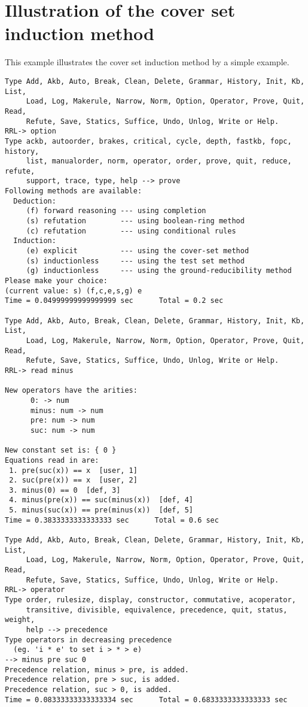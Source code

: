 \chapter{Illustration of the cover set induction method}
\normalsize
\rm
This example illustrates the cover set induction method by a simple 
example.

\small
\begin{verbatim}
Type Add, Akb, Auto, Break, Clean, Delete, Grammar, History, Init, Kb, List,
     Load, Log, Makerule, Narrow, Norm, Option, Operator, Prove, Quit, Read,
     Refute, Save, Statics, Suffice, Undo, Unlog, Write or Help.
RRL-> option
Type ackb, autoorder, brakes, critical, cycle, depth, fastkb, fopc, history, 
     list, manualorder, norm, operator, order, prove, quit, reduce, refute, 
     support, trace, type, help --> prove
Following methods are available:
  Deduction:
     (f) forward reasoning --- using completion
     (s) refutation        --- using boolean-ring method
     (c) refutation        --- using conditional rules
  Induction:
     (e) explicit          --- using the cover-set method
     (s) inductionless     --- using the test set method
     (g) inductionless     --- using the ground-reducibility method
Please make your choice: 
(current value: s) (f,c,e,s,g) e
Time = 0.04999999999999999 sec      Total = 0.2 sec

Type Add, Akb, Auto, Break, Clean, Delete, Grammar, History, Init, Kb, List,
     Load, Log, Makerule, Narrow, Norm, Option, Operator, Prove, Quit, Read,
     Refute, Save, Statics, Suffice, Undo, Unlog, Write or Help.
RRL-> read minus

New operators have the arities:
      0: -> num
      minus: num -> num
      pre: num -> num
      suc: num -> num

New constant set is: { 0 }
Equations read in are:
 1. pre(suc(x)) == x  [user, 1]
 2. suc(pre(x)) == x  [user, 2]
 3. minus(0) == 0  [def, 3]
 4. minus(pre(x)) == suc(minus(x))  [def, 4]
 5. minus(suc(x)) == pre(minus(x))  [def, 5]
Time = 0.3833333333333333 sec      Total = 0.6 sec

Type Add, Akb, Auto, Break, Clean, Delete, Grammar, History, Init, Kb, List,
     Load, Log, Makerule, Narrow, Norm, Option, Operator, Prove, Quit, Read,
     Refute, Save, Statics, Suffice, Undo, Unlog, Write or Help.
RRL-> operator
Type order, rulesize, display, constructor, commutative, acoperator, 
     transitive, divisible, equivalence, precedence, quit, status, weight, 
     help --> precedence
Type operators in decreasing precedence
  (eg. 'i * e' to set i > * > e) 
--> minus pre suc 0 
Precedence relation, minus > pre, is added.
Precedence relation, pre > suc, is added.
Precedence relation, suc > 0, is added.
Time = 0.08333333333333334 sec      Total = 0.6833333333333333 sec


\end{verbatim}
